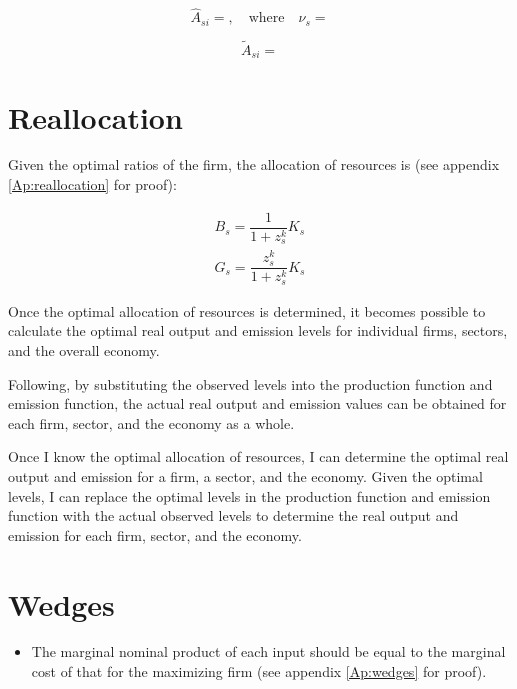 \documentclass[12pt]{article} %
\begin{document}
\begin{equation*}
    \hat{A}_{si} = , \quad \text{where} \quad \nu_s = 
\end{equation*}

\begin{equation*}
    \tilde{A}_{si} = 
\end{equation*}



\section*{Reallocation}
Given the optimal ratios of the firm, the allocation of resources is (see appendix \ref{Ap:reallocation} for proof):

\begin{gather*}
    B_s = \dfrac{1}{1 + z_s^k} K_s \\ 
    G_s = \dfrac{z_s^k}{1 + z_s^k} K_s
\end{gather*}



Once the optimal allocation of resources is determined, it becomes possible to calculate the optimal real output and emission levels for individual firms, sectors, and the overall economy.

Following, by substituting the observed levels into the production function and emission function, the actual real output and emission values can be obtained for each firm, sector, and the economy as a whole.

Once I know the optimal allocation of resources, I can determine the optimal real output and emission for a firm, a sector, and the economy. 
Given the optimal levels, I can replace the optimal levels in the production function and emission function with the actual observed levels to determine the real output and emission for each firm, sector, and the economy.


\section*{Wedges}
\begin{itemize}
    \item The marginal nominal product of each input should be equal to the marginal cost of that for the maximizing firm (see appendix \ref{Ap:wedges} for proof).
	
\end{itemize}
\end{document}
